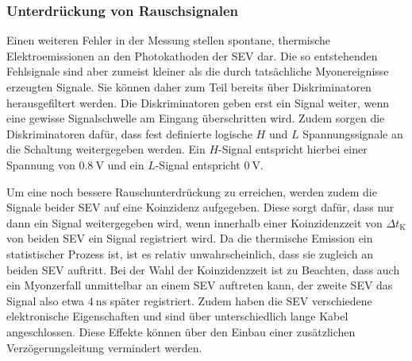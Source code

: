 \subsubsection{Unterdrückung von Rauschsignalen}
Einen weiteren Fehler in der Messung stellen spontane, thermische Elektroemissionen an den Photokathoden der SEV dar.
Die so entstehenden Fehlsignale sind aber zumeist kleiner als die durch tatsächliche Myonereignisse erzeugten Signale.
Sie können daher zum Teil bereits über Diskriminatoren herausgefiltert werden.
Die Diskriminatoren geben erst ein Signal weiter, wenn eine gewisse Signalschwelle am Eingang überschritten wird. Zudem sorgen die Diskriminatoren dafür, dass fest definierte logische $H$ und $L$ Spannungssignale an die Schaltung weitergegeben werden. Ein $H$-Signal entspricht hierbei einer Spannung von $\SI{0.8}{\volt}$ und ein $L$-Signal entspricht $\SI{0}{\volt}$.

Um eine noch bessere Rauschunterdrückung zu erreichen, werden zudem die Signale beider SEV auf eine Koinzidenz aufgegeben.
Diese sorgt dafür, dass nur dann ein Signal weitergegeben wird, wenn innerhalb einer Koinzidenzzeit von $\Delta t_{\mathrm{K}}$ von beiden SEV ein Signal registriert wird.
Da die thermische Emission ein statistischer Prozess ist, ist es relativ unwahrscheinlich, dass sie zugleich an beiden SEV auftritt. Bei der Wahl der Koinzidenzzeit ist zu Beachten, dass auch ein Myonzerfall unmittelbar an einem SEV auftreten kann, der zweite SEV das Signal also etwa $\SI{4}{\nano\second}$ später registriert. Zudem haben die SEV verschiedene elektronische Eigenschaften und sind über unterschiedlich lange Kabel angeschlossen.
Diese Effekte können über den Einbau einer zusätzlichen Verzögerungsleitung vermindert werden.
